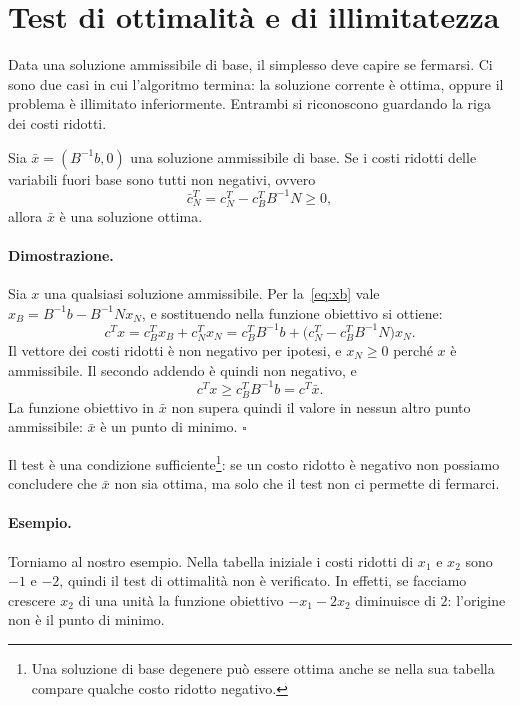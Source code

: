 \section{Test di ottimalità e di illimitatezza}\label{sec:test}
Data una soluzione ammissibile di base, il simplesso deve capire se fermarsi. Ci sono due casi in cui l'algoritmo termina: la soluzione corrente è ottima, oppure il problema è illimitato inferiormente. Entrambi si riconoscono guardando la riga dei costi ridotti.

\begin{teorema}\label{teo:ottimalita}
Sia $\bar{x} = (B^{-1}b, 0)$ una soluzione ammissibile di base. Se i costi ridotti delle variabili fuori base sono tutti non negativi, ovvero
\[
\bar{c}_N^T = c_N^T - c_B^T B^{-1} N \ge 0,
\]
allora $\bar{x}$ è una soluzione ottima.
\end{teorema}

\paragraph{Dimostrazione.}
Sia $x$ una qualsiasi soluzione ammissibile. Per la~\eqref{eq:xb} vale $x_B = B^{-1}b - B^{-1}N x_N$, e sostituendo nella funzione obiettivo si ottiene:
\[
c^T x = c_B^T x_B + c_N^T x_N = c_B^T B^{-1} b + \big(c_N^T - c_B^T B^{-1} N\big) x_N.
\]
Il vettore dei costi ridotti è non negativo per ipotesi, e $x_N \ge 0$ perché $x$ è ammissibile. Il secondo addendo è quindi non negativo, e
\[
c^T x \ge c_B^T B^{-1} b = c^T \bar{x}.
\]
La funzione obiettivo in $\bar{x}$ non supera quindi il valore in nessun altro punto ammissibile: $\bar{x}$ è un punto di minimo. \hfill $\square$

\vspace{0.5em}
Il test è una condizione sufficiente\footnote{Una soluzione di base degenere può essere ottima anche se nella sua tabella compare qualche costo ridotto negativo.}: se un costo ridotto è negativo non possiamo concludere che $\bar{x}$ non sia ottima, ma solo che il test non ci permette di fermarci.

\paragraph{Esempio.}
Torniamo al nostro esempio. Nella tabella iniziale i costi ridotti di $x_1$ e $x_2$ sono $-1$ e $-2$, quindi il test di ottimalità non è verificato. In effetti, se facciamo crescere $x_2$ di una unità la funzione obiettivo $-x_1 - 2x_2$ diminuisce di $2$: l'origine non è il punto di minimo.

